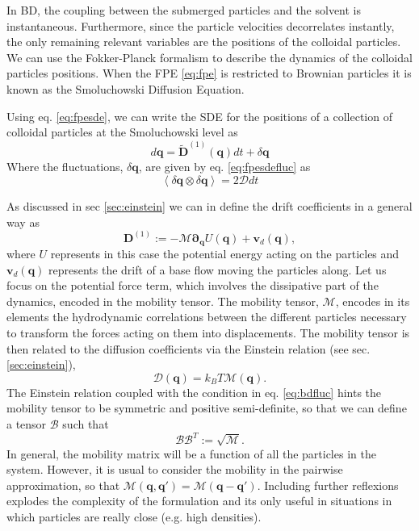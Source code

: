 \documentclass[ twoside,openright,titlepage,numbers=noenddot,%
headinclude,footinclude,cleardoublepage=empty,abstract=on,
BCOR=5mm,paper=a4,fontsize=11pt, dvipsnames
]{scrreprt}
\renewcommand{\vec}[1]{\bm{#1}}
\newcommand{\tens}[1]{\bm{\mathcal{#1}}}
\newcommand{\kT}{k_B T}
\newcommand{\ppos}{q}
\begin{document}
In \gls{BD}, the coupling between the submerged particles and the solvent is instantaneous.
Furthermore, since the particle velocities decorrelates instantly, the only remaining relevant variables are the positions of the colloidal particles. We can use the Fokker-Planck formalism to describe the dynamics of the colloidal particles positions. When the \gls{FPE} \eqref{eq:fpe} is restricted to Brownian particles it is known as the Smoluchowski Diffusion Equation.

Using eq. \eqref{eq:fpesde}, we can write the \gls{SDE} for the positions of a collection of colloidal particles at the Smoluchowski level as
\begin{equation}
  \label{eq:bdlange}
  d\vec{\ppos} = \widetilde{\vec{D}}^{(1)}(\vec{\ppos})dt + \delta\vec{\ppos}
\end{equation}
Where the fluctuations, $\delta\vec{\ppos}$, are given by eq. \eqref{eq:fpesdefluc} as
\begin{equation}
  \label{eq:bdfluc}
  \left\langle \delta\vec{\ppos}\otimes \delta\vec{\ppos}\right\rangle = 2\tens{D} dt
\end{equation}

As discussed in sec \ref{sec:einstein} we can in define the drift coefficients in a general way as
\begin{equation}
  \label{eq:bddrift}
\vec{D}^{(1)} := -\tens{M}\vec{\partial}_{\vec{\ppos}}U(\vec{\ppos}) + \vec{v}_d(\vec{\ppos}),
\end{equation}
where $U$ represents in this case the potential energy acting on the particles and $\vec{v}_d(\vec{\ppos})$ represents the drift of a base flow moving the particles along. Let us focus on the potential force term, which involves the dissipative part of  the dynamics, encoded in the mobility tensor. The mobility tensor, $\tens{M}$, encodes in its elements the hydrodynamic correlations between the different particles necessary to transform the forces acting on them into displacements.
The mobility tensor is then related to the diffusion coefficients via the Einstein relation (see sec. \ref{sec:einstein}),
\begin{equation}
  \label{eq:bdeinstein}
  \tens{D}(\vec{\ppos}) = \kT \tens{M}(\vec{\ppos}).
\end{equation}
The Einstein relation coupled with the condition in eq. \eqref{eq:bdfluc} hints the mobility tensor to be symmetric and positive semi-definite, so that we can define a tensor $\tens{B}$ such that
\begin{equation}
  \tens{B}\tens{B}^T := \sqrt{\tens{M}}.
\end{equation}
In general, the mobility matrix will be a function of all the particles in the system. However, it is usual to consider the mobility in the pairwise approximation, so that $\tens{M}(\vec{\ppos}, \vec{\ppos}') = \tens{M}(\vec{\ppos}-\vec{\ppos}')$. Including further reflexions explodes the complexity of the formulation and its only useful in situations in which particles are really close (e.g. high densities)\cite{Dhont1996}.
\end{document}
